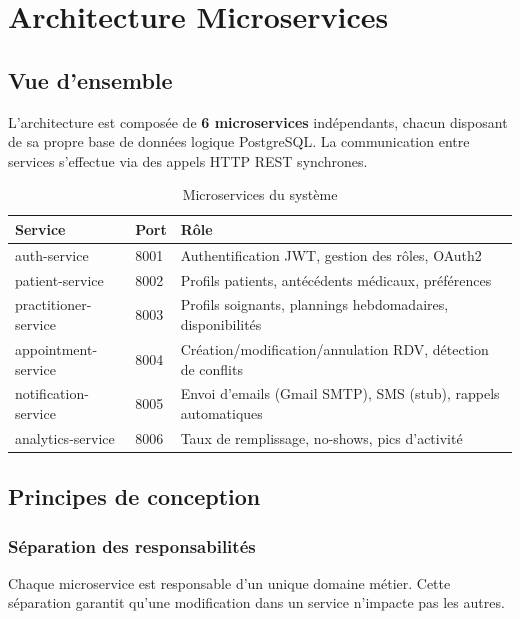 \documentclass[12pt,a4paper]{article}
\begin{document}
\section{Architecture Microservices}

\subsection{Vue d'ensemble}

L'architecture est composée de \textbf{6 microservices} indépendants, chacun disposant de sa propre base de données logique PostgreSQL. La communication entre services s'effectue via des appels HTTP REST synchrones.

\begin{table}[H]
\centering
\caption{Microservices du système}
\begin{tabularx}{\textwidth}{C{3cm} C{1.5cm} X}
\toprule
\textbf{Service} & \textbf{Port} & \textbf{Rôle} \\
\midrule
auth-service & 8001 & Authentification JWT, gestion des rôles, OAuth2 \\
patient-service & 8002 & Profils patients, antécédents médicaux, préférences \\
practitioner-service & 8003 & Profils soignants, plannings hebdomadaires, disponibilités \\
appointment-service & 8004 & Création/modification/annulation RDV, détection de conflits \\
notification-service & 8005 & Envoi d'emails (Gmail SMTP), SMS (stub), rappels automatiques \\
analytics-service & 8006 & Taux de remplissage, no-shows, pics d'activité \\
\bottomrule
\end{tabularx}
\end{table}

\subsection{Principes de conception}

\subsubsection{Séparation des responsabilités}
Chaque microservice est responsable d'un unique domaine métier. Cette séparation garantit qu'une modification dans un service n'impacte pas les autres.
\end{document}
